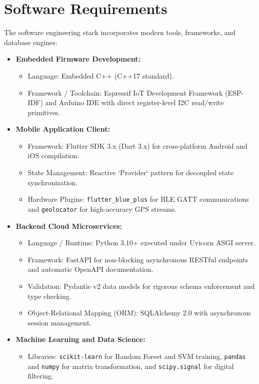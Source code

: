 \section{Software Requirements}
\label{sec:software_reqs}
The software engineering stack incorporates modern tools, frameworks, and database engines:

\begin{itemize}
    \item \textbf{Embedded Firmware Development:}
    \begin{itemize}
        \item Language: Embedded C++ (C++17 standard).
        \item Framework / Toolchain: Espressif IoT Development Framework (ESP-IDF) and Arduino IDE with direct register-level I2C read/write primitives.
    \end{itemize}
    
    \item \textbf{Mobile Application Client:}
    \begin{itemize}
        \item Framework: Flutter SDK 3.x (Dart 3.x) for cross-platform Android and iOS compilation.
        \item State Management: Reactive `Provider` pattern for decoupled state synchronization.
        \item Hardware Plugins: \texttt{flutter\_blue\_plus} for BLE GATT communications and \texttt{geolocator} for high-accuracy GPS streams.
    \end{itemize}
    
    \item \textbf{Backend Cloud Microservices:}
    \begin{itemize}
        \item Language / Runtime: Python 3.10+ executed under Uvicorn ASGI server.
        \item Framework: FastAPI for non-blocking asynchronous RESTful endpoints and automatic OpenAPI documentation.
        \item Validation: Pydantic v2 data models for rigorous schema enforcement and type checking.
        \item Object-Relational Mapping (ORM): SQLAlchemy 2.0 with asynchronous session management.
    \end{itemize}
    
    \item \textbf{Machine Learning and Data Science:}
    \begin{itemize}
        \item Libraries: \texttt{scikit-learn} for Random Forest and SVM training, \texttt{pandas} and \texttt{numpy} for matrix transformation, and \texttt{scipy.signal} for digital filtering.
    \end{itemize}
    

\end{itemize}
